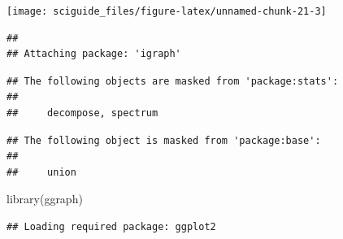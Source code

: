 \documentclass[]{tufte-book}
\newenvironment{Shaded}{}{}
\newcommand{\AttributeTok}[1]{\textcolor[rgb]{0.49,0.56,0.16}{#1}}
\newcommand{\CommentTok}[1]{\textcolor[rgb]{0.38,0.63,0.69}{\textit{#1}}}
\newcommand{\DecValTok}[1]{\textcolor[rgb]{0.25,0.63,0.44}{#1}}
\newcommand{\FloatTok}[1]{\textcolor[rgb]{0.25,0.63,0.44}{#1}}
\newcommand{\FunctionTok}[1]{\textcolor[rgb]{0.02,0.16,0.49}{#1}}
\newcommand{\NormalTok}[1]{#1}
\newcommand{\OtherTok}[1]{\textcolor[rgb]{0.00,0.44,0.13}{#1}}
\newcommand{\SpecialCharTok}[1]{\textcolor[rgb]{0.25,0.44,0.63}{#1}}
\begin{document}
\texttt{[image: sciguide\_files/figure-latex/unnamed-chunk-21-3]}

\begin{Shaded}
\end{Shaded}

\begin{verbatim}
## 
## Attaching package: 'igraph'
\end{verbatim}

\begin{verbatim}
## The following objects are masked from 'package:stats':
## 
##     decompose, spectrum
\end{verbatim}

\begin{verbatim}
## The following object is masked from 'package:base':
## 
##     union
\end{verbatim}

\begin{Shaded}
\begin{Highlighting}[]
\FunctionTok{library}\NormalTok{(ggraph)}
\end{Highlighting}
\end{Shaded}

\begin{verbatim}
## Loading required package: ggplot2
\end{verbatim}
\end{document}
